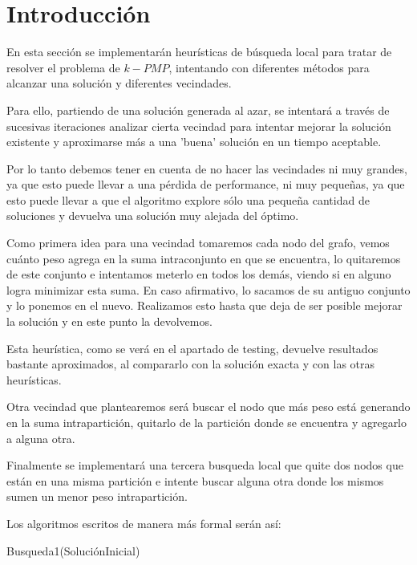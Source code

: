 \section{Introducci\'on}

En esta sección se implementarán heurísticas de búsqueda local para tratar de resolver el problema de $k-PMP$, intentando con diferentes métodos para alcanzar una solución y diferentes vecindades.

Para ello, partiendo de una solución generada al azar, se intentará a través de sucesivas iteraciones analizar cierta vecindad para intentar mejorar la solución existente y aproximarse más a una 'buena' solución en un tiempo aceptable. 

Por lo tanto debemos tener en cuenta de no hacer las vecindades ni muy grandes, ya que esto puede llevar a una pérdida de performance, ni muy pequeñas, ya que esto puede llevar a que el algoritmo explore sólo una pequeña cantidad de soluciones y devuelva una solución muy alejada del óptimo.

Como primera idea para una vecindad tomaremos cada nodo del grafo, vemos cuánto peso agrega en la suma intraconjunto en que se encuentra, lo quitaremos de este conjunto e intentamos meterlo en todos los demás, viendo si en alguno logra minimizar esta suma. En caso afirmativo, lo sacamos de su antiguo conjunto y lo ponemos en el nuevo. Realizamos esto hasta que deja de ser posible mejorar la solución y en este punto la devolvemos.

Esta heurística, como se verá en el apartado de testing, devuelve resultados bastante aproximados, al compararlo con la solución exacta y con las otras heurísticas.

Otra vecindad que plantearemos será buscar el nodo que más peso está generando en la suma intrapartición, quitarlo de la partición donde se encuentra y agregarlo a alguna otra.

Finalmente se implementará una tercera busqueda local que quite dos nodos que están en una misma partición e intente buscar alguna otra donde los mismos sumen un menor peso intrapartición.

Los algoritmos escritos de manera más formal serán así:

\begin{algorithm}
  	\begin{algorithmic}[1]\parskip=1mm
		 \caption{ Busqueda1(SoluciónInicial) }
	\end{algorithmic}
\end{algorithm}

